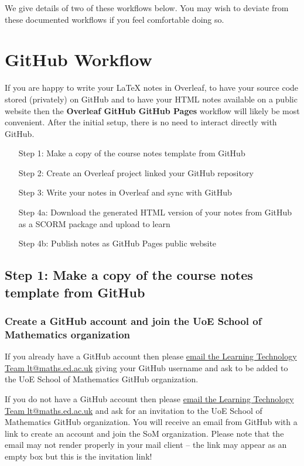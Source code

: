 We give details of two of these workflows below. You may wish to deviate from these documented workflows if you feel comfortable doing so. 

\section{GitHub Workflow}

If you are happy to write your \LaTeX{} notes in Overleaf, to have your source code stored (privately) on GitHub and to have your HTML notes available on a public website then the \textbf{Overleaf \textrightarrow{} GitHub \textrightarrow{} GitHub Pages} workflow will likely be most convenient. After the initial setup, there is no need to interact directly with GitHub.

\begin{enumerate}[align=left]
    \item[Step 1:] Make a copy of the course notes template from GitHub
    \item[Step 2:] Create an Overleaf project linked your GitHub repository
    \item[Step 3:] Write your notes in Overleaf and sync with GitHub
    \item[Step 4a:] Download the generated HTML version of your notes from GitHub as a SCORM package and upload to learn
    \item[Step 4b:] Publish notes as GitHub Pages public website
\end{enumerate}


\subsection{Step 1: Make a copy of the course notes template from GitHub}

\subsubsection{Create a GitHub account and join the UoE School of Mathematics organization}

If you already have a GitHub account then please  \href{mailto:lt@maths.ed.ac.uk?subject=Please%20add%20me%20to%20SoM%20GitHub%20organization}{email the Learning Technology Team lt@maths.ed.ac.uk} giving your GitHub username and ask to be added to the UoE School of Mathematics GitHub organization. 

If you do not have a GitHub account then please \href{mailto:lt@maths.ed.ac.uk?subject=Please%20add%20me%20to%20SoM%20GitHub%20organization}{email the Learning Technology Team lt@maths.ed.ac.uk} and ask for an invitation to the UoE School of Mathematics GitHub organization. You will receive an email from GitHub with a link to create an account and join the SoM organization. Please note that the email may not render properly in your mail client -- the link may appear as an empty box but this is the invitation link!



